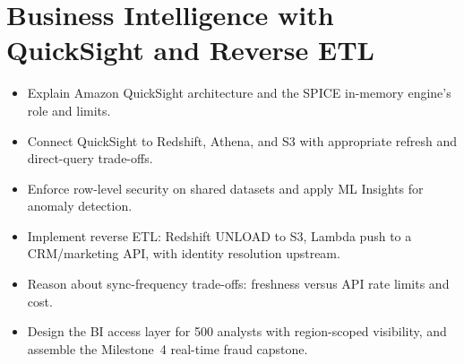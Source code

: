 \chapter{Business Intelligence with QuickSight and Reverse ETL}
%
\begin{objectives}
\begin{itemize}
    \item Explain Amazon QuickSight architecture and the SPICE in-memory engine's role and limits.
    \item Connect QuickSight to Redshift, Athena, and S3 with appropriate refresh and direct-query trade-offs.
    \item Enforce row-level security on shared datasets and apply ML Insights for anomaly detection.
    \item Implement reverse ETL: Redshift UNLOAD to S3, Lambda push to a CRM/marketing API, with identity resolution upstream.
    \item Reason about sync-frequency trade-offs: freshness versus API rate limits and cost.
    \item Design the BI access layer for 500 analysts with region-scoped visibility, and assemble the Milestone~4 real-time fraud capstone.
\end{itemize}
\end{objectives}

